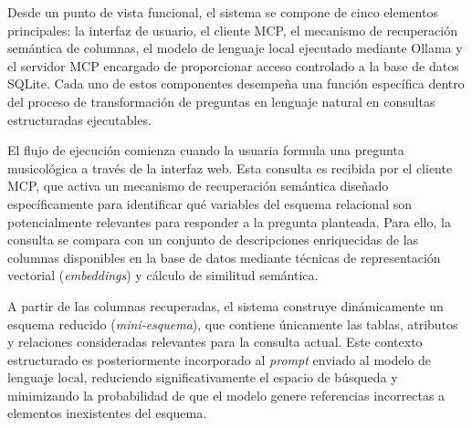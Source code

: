 Desde un punto de vista funcional, el sistema se compone de cinco elementos principales: la interfaz de usuario, el cliente MCP, el mecanismo de recuperación semántica de columnas, el modelo de lenguaje local ejecutado mediante Ollama y el servidor MCP encargado de proporcionar acceso controlado a la base de datos SQLite. Cada uno de estos componentes desempeña una función específica dentro del proceso de transformación de preguntas en lenguaje natural en consultas estructuradas ejecutables.

El flujo de ejecución comienza cuando la usuaria formula una pregunta musicológica a través de la interfaz web. Esta consulta es recibida por el cliente MCP, que activa un mecanismo de recuperación semántica diseñado específicamente para identificar qué variables del esquema relacional son potencialmente relevantes para responder a la pregunta planteada. Para ello, la consulta se compara con un conjunto de descripciones enriquecidas de las columnas disponibles en la base de datos mediante técnicas de representación vectorial (\textit{embeddings}) y cálculo de similitud semántica.


A partir de las columnas recuperadas, el sistema construye dinámicamente un esquema reducido (\textit{mini-esquema}), que contiene únicamente las tablas, atributos y relaciones consideradas relevantes para la consulta actual. Este contexto estructurado es posteriormente incorporado al \textit{prompt} enviado al modelo de lenguaje local, reduciendo significativamente el espacio de búsqueda y minimizando la probabilidad de que el modelo genere referencias incorrectas a elementos inexistentes del esquema.


